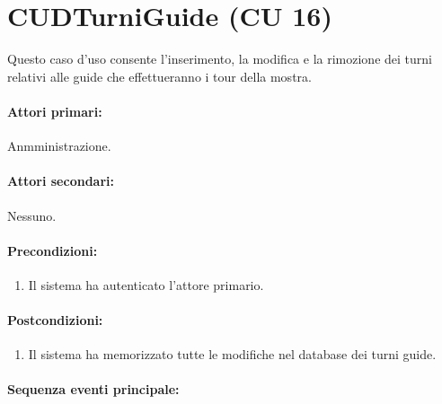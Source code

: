 \documentclass{article}
\begin{document}
\newpage

\section*{CUDTurniGuide (CU 16)}
	
\indent\indent Questo caso d'uso consente l’inserimento, la modifica e la rimozione dei turni relativi alle guide che effettueranno i tour della mostra.
	
	\paragraph{Attori primari:}Anmministrazione.
	
	\paragraph{Attori secondari:}Nessuno.
	
	\paragraph{Precondizioni:}
		\begin{enumerate}	[itemsep=8pt,parsep=0pt]
			\item Il sistema ha autenticato l'attore primario.
		\end{enumerate}
	
	\paragraph{Postcondizioni:}
\begin{enumerate}	[itemsep=8pt,parsep=0pt]
\item Il sistema ha memorizzato tutte le modifiche nel database dei turni guide.
\end{enumerate}
	
	\paragraph{Sequenza eventi principale:}
\end{document}
